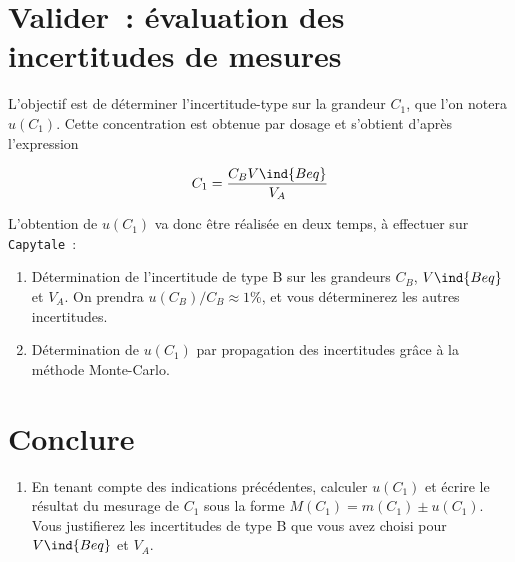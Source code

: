 \documentclass[a4paper, 10pt, final, garamond]{book}
\begin{document}
\section{Valider~: évaluation des incertitudes de mesures}

L'objectif est de déterminer l'incertitude-type sur la grandeur $C_1$, que l'on
notera $u(C_1)$. Cette concentration est obtenue par dosage et s'obtient d'après
l'expression 

\[
    C_1 = \frac{C_B V\ind{Beq}}{V_A}
\]

L'obtention de $u(C_1)$ va donc être réalisée en deux temps, à effectuer sur
\texttt{Capytale}~:
\begin{enumerate}
    \item Détermination de l'incertitude de type B sur les grandeurs $C_B$,
        $V\ind{Beq}$ et $V_A$. On prendra $u(C_B)/C_B \approx 1 \%$, et vous
        déterminerez les autres incertitudes.
    \item Détermination de $u(C_1)$ par propagation des incertitudes grâce à la
        méthode Monte-Carlo.
\end{enumerate}

\section{Conclure}

\begin{enumerate}[label=\sqenumi, start=12]
    \item En tenant compte des indications précédentes, calculer $u(C_1)$ et
        écrire le résultat du mesurage de $C_1$ sous la forme $M(C_1) = m(C_1)
        \pm u(C_1)$. Vous justifierez les incertitudes de type B que vous avez
        choisi pour $V\ind{Beq}$ et $V_A$.
\end{enumerate}

% 
\end{document}
